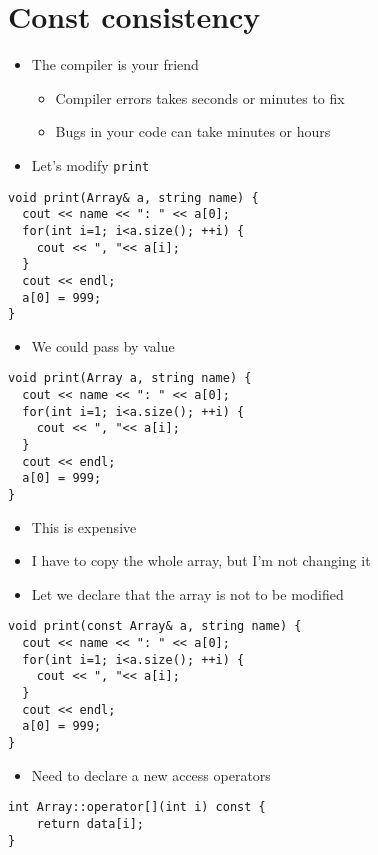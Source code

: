 \documentclass[11pt]{article}
\begin{document}
\section{Const consistency}
\label{sec:org7eb4a2d}
\begin{itemize}
\item The compiler is your friend
\begin{itemize}
\item Compiler errors takes seconds or minutes to fix
\item Bugs in your code can take minutes or hours
\end{itemize}
\item Let's modify \texttt{print}
\end{itemize}
\begin{verbatim}
void print(Array& a, string name) {
  cout << name << ": " << a[0];
  for(int i=1; i<a.size(); ++i) {
    cout << ", "<< a[i];
  }
  cout << endl;
  a[0] = 999;
}
\end{verbatim}
\begin{itemize}
\item We could pass by value
\end{itemize}
\begin{verbatim}
void print(Array a, string name) {
  cout << name << ": " << a[0];
  for(int i=1; i<a.size(); ++i) {
    cout << ", "<< a[i];
  }
  cout << endl;
  a[0] = 999;
}
\end{verbatim}
\begin{itemize}
\item This is expensive
\item I have to copy the whole array, but I'm not changing it
\item Let we declare that the array is not to be modified
\end{itemize}
\begin{verbatim}
void print(const Array& a, string name) {
  cout << name << ": " << a[0];
  for(int i=1; i<a.size(); ++i) {
    cout << ", "<< a[i];
  }
  cout << endl;
  a[0] = 999;
}
\end{verbatim}
\begin{itemize}
\item Need to declare a new access operators
\end{itemize}
\begin{verbatim}
int Array::operator[](int i) const {
    return data[i];
}
\end{verbatim}
\end{document}
